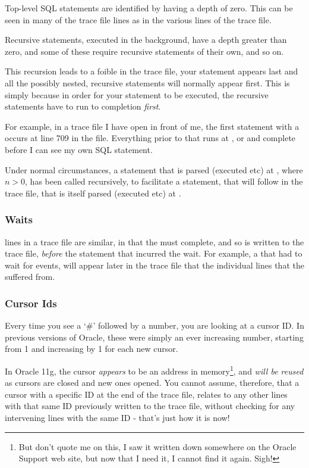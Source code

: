 Top-level SQL statements are identified by having a depth of zero. This can be seen in many of the trace file lines as  in the various lines of the trace file.

Recursive statements, executed in the background, have a depth greater than zero, and some of these require recursive statements of their own, and so on.

This recursion leads to a foible in the trace file, your statement appears last and all the possibly nested, recursive statements will normally appear first. This is simply because in order for your statement to be executed, the recursive statements have to run to completion \emph{first}.

For example, in a trace file I have open in front of me, the first statement with a  occurs at line 709 in the file. Everything prior to that runs at ,  or  and complete before I can see my own SQL statement. 

Under normal circumstances, a statement that is parsed (executed etc) at , where $n > 0$, has been called recursively, to facilitate a statement, that will follow in the trace file, that is itself parsed (executed etc) at .

\subsubsection{Waits}\label{waits}

 lines in a trace file are similar, in that the  must complete, and so is written to the trace file, \emph{before} the statement that incurred the wait. For example, a  that had to wait for  events, will appear later in the trace file that the individual  lines that the  suffered from.

\subsubsection{Cursor Ids}\label{cursor-ids}

Every time you see a `\#' followed by a number, you are looking at a cursor ID. In previous versions of Oracle, these were simply an ever increasing number, starting from 1 and increasing by 1 for each new cursor.

In Oracle 11g, the cursor \emph{appears} to be an address in memory\footnote{But don't quote me on this, I saw it written down somewhere on the Oracle Support web site, but now that I need it, I cannot find it again. Sigh!}, and \emph{will be reused} as cursors are closed and new ones opened. You cannot assume, therefore, that a cursor with a specific ID at the end of the trace file, relates to any other lines with that same ID previously written to the trace file, without checking for any intervening  lines with the same ID - that's just how it is now!

